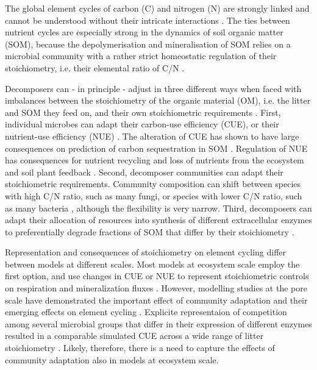
\introduction 
The global element cycles of carbon (C) and nitrogen (N) are strongly linked
and cannot be understood without their intricate interactions 
\citep{Thornton07,Janssens10, Zaehle11}. 
The ties between nutrient cycles are especially strong
in the dynamics of soil organic matter (SOM), because the depolymerisation and mineralisation of SOM relies on a microbial community with a rather strict homeostatic regulation of their stoichiometry, i.e. their elemental ratio of C/N \citep{Sterner02, Zechmeister15}.


Decomposers can - in principle - adjust in three different ways when faced with imbalances between the stoichiometry of the organic material (OM), i.e. the litter and SOM they
feed on, and their own stoichiometric requirements \citep{Mooshammer14}.
First, individual microbes can adapt their carbon-use efficiency (CUE), or their nutrient-use
efficiency (NUE) \citep{Sinsabaugh13}. The alteration of CUE has shown to have
large consequences on prediction of carbon sequestration in SOM
\citep{Allison14a, Wieder13}.
Regulation of NUE has consequences for nutrient recycling and loss of nutrients
from the ecosystem \citep{Mooshammer14a} and soil plant feedback
\citep{Rastetter11}.
Second, decomposer communities can adapt their stoichiometric
requirements. Community composition can shift between species with high C/N
ratio, such as many fungi, or species with lower C/N ratio, such as many
bacteria \citep{Cleveland07, Xu13}, although the flexibility is very narrow.
Third, decomposers can adapt their allocation of resources into
synthesis of different extracellular enzymes to preferentially degrade
fractions of SOM that differ by their stoichiometry \citep{Moorhead12}.

Representation and consequences of stoichiometry on element cycling differ
between models at different scales. Most models at ecosystem scale employ the
first option, and use changes in CUE or NUE to represent stoichiometric controls
on respiration and mineralization fluxes \citep{Manzoni08}. However, modelling
studies at the pore scale have demonstrated the important effect of community
adaptation and their emerging effects on element cycling \citep{Allison05,
Resat11, Wang13}. Explicite representaion of competition among several microbial
groups that differ in their expression of different enzymes resulted in a
comparable simulated CUE across a wide range of litter stoichiometry
\citep{Kaiser14}. Likely, therefore, there is a need to capture the effects of
community adaptation also in models at ecosystem scale.

